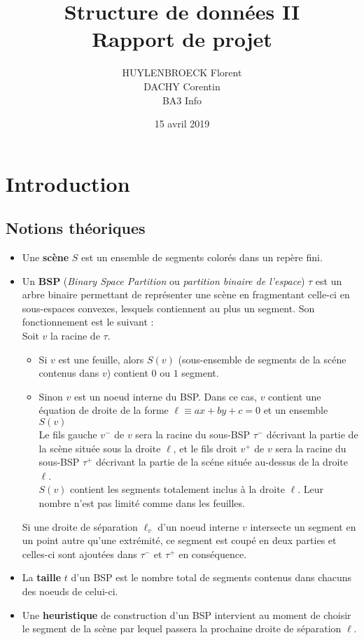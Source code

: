 \documentclass[11pts]{article}
\title{Structure de données II\\Rapport de projet}
\author{HUYLENBROECK Florent\\DACHY Corentin\\BA3 Info}
\date{15 avril 2019}
\begin{document}
\maketitle
\newpage
\tableofcontents
\newpage
\section{Introduction}
\subsection{Notions théoriques}
\begin{itemize}
\item Une \textbf{scène} $S$ est un ensemble de segments colorés dans un repère fini.
\item Un \textbf{BSP} (\emph{Binary Space Partition} ou \emph{partition binaire de l'espace}) $\tau$ est un arbre binaire permettant de représenter une scène en fragmentant celle-ci en sous-espaces convexes, lesquels contiennent au plus un segment.
Son fonctionnement est le suivant :\\[.2cm]
Soit $v$ la racine de $\tau$.
\begin{itemize}
\item Si $v$ est une feuille, alors $S(v)$ (sous-ensemble de segments de la scéne contenus dans $v$) contient $0$ ou $1$ segment.
\item Sinon $v$ est un noeud interne du BSP. Dans ce cas, $v$ contient une équation de droite de la forme $\ell\equiv ax+by+c=0$ et un ensemble $S(v)$\\
Le fils gauche $v^-$ de $v$ sera la racine du sous-BSP $\tau^-$ décrivant la partie de la scène située sous la droite $\ell$, et le fils droit $v^+$ de $v$ sera la racine du sous-BSP $\tau^+$ décrivant la partie de la scéne située au-dessus de la droite $\ell$.\\
$S(v)$ contient les segments totalement inclus à la droite $\ell$. Leur nombre n'est pas limité comme dans les feuilles.
\end{itemize}
Si une droite de séparation $\ell_v$ d'un noeud interne $v$ intersecte un segment en un point autre qu'une extrémité, ce segment est coupé en deux parties et celles-ci sont ajoutées dans $\tau^-$ et $\tau^+$ en conséquence.
\item La \textbf{taille} $t$ d'un BSP est le nombre total de segments contenus dans chacuns des noeuds de celui-ci.
\item Une \textbf{heuristique} de construction d'un BSP intervient au moment de choisir le segment de la scène par lequel passera la prochaine droite de séparation $\ell$.
\end{itemize}
\end{document}
